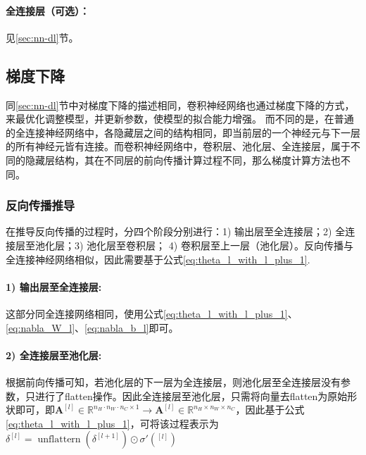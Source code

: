 \paragraph{全连接层（可选）：}
见\ref{sec:nn-dl}节。

\subsection{梯度下降}
同\ref{sec:nn-dl}节中对梯度下降的描述相同，卷积神经网络也通过梯度下降的方式，来最优化调整模型，并更新参数，使模型的拟合能力增强。
而不同的是，在普通的全连接神经网络中，各隐藏层之间的结构相同，即当前层的一个神经元与下一层的所有神经元皆有连接。而卷积神经网络中，卷积层、池化层、全连接层，属于不同的隐藏层结构，其在不同层的前向传播计算过程不同，那么梯度计算方法也不同。
\subsubsection{反向传播推导}
在推导反向传播的过程时，分四个阶段分别进行：1) 输出层至全连接层；2) 全连接层至池化层；3) 池化层至卷积层； 4) 卷积层至上一层（池化层）。反向传播与全连接神经网络相似，因此需要基于公式\ref{eq:theta_l_with_l_plus_1}. 
\paragraph{1) 输出层至全连接层:}这部分同全连接网络相同，使用公式\ref{eq:theta_l_with_l_plus_1}、\ref{eq:nabla_W_l}、\ref{eq:nabla_b_l}即可。
\paragraph{2) 全连接层至池化层:}
根据前向传播可知，若池化层的下一层为全连接层，则池化层至全连接层没有参数，只进行了flatten操作。因此全连接层至池化层，只需将向量去flatten为原始形状即可，即$\mathbf{A}^{[l]} \in \mathbb{R}^{n_H \cdot n_W \cdot n_C \times 1} \rightarrow \mathbf{A}^{[l]} \in  \mathbb{R}^{n_H \times n_W \times n_C}$，因此基于公式\ref{eq:theta_l_with_l_plus_1}，可将该过程表示为$\delta^{[l]} = \operatorname{unflattern}\left(\delta ^{[l + 1]}\right) \odot \sigma ' \left(^{[l]}\right)$
